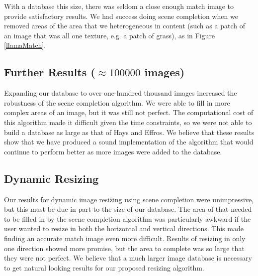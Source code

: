 \documentclass[11pt]{amsart}
\begin{document}
With a database this size, there was seldom a close enough match image to provide satisfactory results. We had success doing scene completion when we removed areas of the area that we heterogeneous in content (such as a patch of an image that was all one texture, e.g. a patch of grass), as in Figure \ref{llamaMatch}.


\subsection{Further Results ($\approx100000$ images)} 

Expanding our database to over one-hundred thousand images increased the robustness of 
the scene completion algorithm. We were able to fill in more complex areas of an image, but
it was still not perfect. The computational cost of this algorithm made it difficult given the time constraints, so we were not able to build a database as large as that of Hays and Effros. We believe 
that these results show that we have produced a sound implementation of the algorithm that would
continue to perform better as more images were added to the database.

\subsection{Dynamic Resizing}

Our results for dynamic image resizing using scene completion were unimpressive, but this must be due in part to the size of our database. The area of that needed to be filled in by the scene completion algorithm was particularly awkward if the user wanted to resize in both the horizontal and vertical directions. This made finding an accurate match image even more difficult. Results of resizing in only one direction showed more promise, but the area to complete was so large that they were not perfect. We believe that a much larger image database is necessary to get natural looking results for our proposed resizing algorithm.
\end{document}
